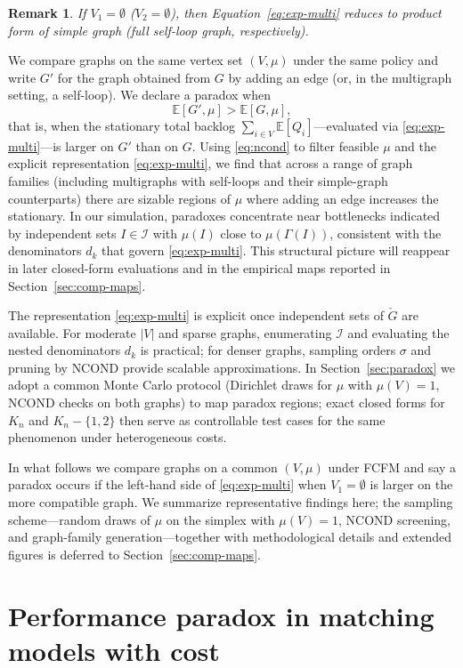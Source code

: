 \documentclass[11pt]{article}
\newtheorem{remark}[theorem]{Remark}
\begin{document}
{\begin{remark}
If $V_1=\emptyset$ ($V_2=\emptyset$), then Equation~\eqref{eq:exp-multi} reduces to product form of simple graph (full self-loop graph, respectively).
\end{remark}
We compare graphs on the same vertex set $(V,\mu)$ under the same policy and write $G'$ for the graph obtained from $G$ by adding an edge (or, in the multigraph setting, a self-loop). We declare a paradox when
\[
\mathbb{E}[G',\mu]>\mathbb{E}[G,\mu],
\]
that is, when the stationary total backlog $\sum_{i\in V}\mathbb{E}[Q_i]$—evaluated via \eqref{eq:exp-multi}—is larger on $G'$ than on $G$. Using \eqref{eq:ncond} to filter feasible $\mu$ and the explicit representation \eqref{eq:exp-multi}, we find that across a range of graph families (including multigraphs with self-loops and their simple-graph counterparts) there are sizable regions of $\mu$ where adding an edge increases the stationary. In our simulation, paradoxes concentrate near bottlenecks indicated by independent sets $I\in\mathcal{I}$ with $\mu(I)$ close to $\mu(\Gamma(I))$, consistent with the denominators $d_k$ that govern \eqref{eq:exp-multi}. This structural picture will reappear in later closed-form evaluations and in the empirical maps reported in Section~\ref{sec:comp-maps}.

The representation \eqref{eq:exp-multi} is explicit once independent sets of $\check{G}$ are available. For moderate $|V|$ and sparse graphs, enumerating $\mathcal{I}$ and evaluating the nested denominators $d_k$ is practical; for denser graphs, sampling orders $\sigma$ and pruning by \textsc{NCOND} provide scalable approximations. In Section~\ref{sec:paradox} we adopt a common Monte Carlo protocol (Dirichlet draws for $\mu$ with $\mu(V)=1$, \textsc{NCOND} checks on both graphs) to map paradox regions; exact closed forms for $K_n$ and $K_n-\{1,2\}$ then serve as controllable test cases for the same phenomenon under heterogeneous costs.

In what follows we compare graphs on a common $(V,\mu)$ under \textsc{FCFM} and say a paradox occurs if the left-hand side of \eqref{eq:exp-multi} when $V_1=\emptyset$ is larger on the more compatible graph. We summarize representative findings here; the sampling scheme—random draws of $\mu$ on the simplex with $\mu(V)=1$, \textsc{NCOND} screening, and graph-family generation—together with methodological details and extended figures is deferred to Section~\ref{sec:comp-maps}.

\section{Performance paradox in matching models with cost}\label{sec:matchcost}

}
\end{document}
